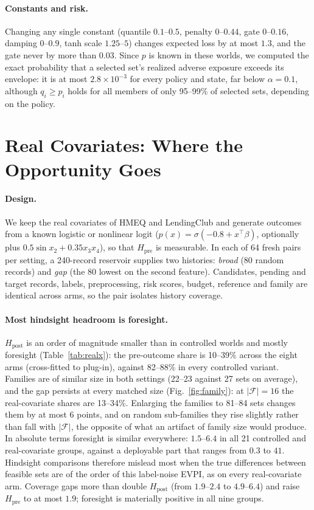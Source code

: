 \documentclass[runningheads]{llncs}
\begin{document}
\paragraph{Constants and risk.} Changing any single constant (quantile $0.1$--$0.5$, penalty $0$--$0.44$, gate $0$--$0.16$, damping $0$--$0.9$, tanh scale $1.25$--$5$) changes expected loss by at most $1.3$, and the gate never by more than $0.03$. Since $p$ is known in these worlds, we computed the exact probability that a selected set's realized adverse exposure exceeds its envelope: it is at most $2.8\times10^{-3}$ for every policy and state, far below $\alpha=0.1$, although $q_i\ge p_i$ holds for all members of only 95--99\% of selected sets, depending on the policy.

\section{Real Covariates: Where the Opportunity Goes}
\label{sec:realx}
\paragraph{Design.} We keep the real covariates of HMEQ and LendingClub and generate outcomes from a known logistic or nonlinear logit ($p(x)=\sigma(-0.8+x^\top\beta)$, optionally plus $0.5\sin x_2+0.35x_3x_4$), so that $H_{\mathrm{pre}}$ is measurable. In each of 64 fresh pairs per setting, a 240-record reservoir supplies two histories: \emph{broad} (80 random records) and \emph{gap} (the 80 lowest on the second feature). Candidates, pending and target records, labels, preprocessing, risk scores, budget, reference and family are identical across arms, so the pair isolates history coverage.

\paragraph{Most hindsight headroom is foresight.} $H_{\mathrm{post}}$ is an order of magnitude smaller than in controlled worlds and mostly foresight (Table~\ref{tab:realx}): the pre-outcome share is 10--39\% across the eight arms (cross-fitted to plug-in), against 82--88\% in every controlled variant. Families are of similar size in both settings (22--23 against 27 sets on average), and the gap persists at every matched size (Fig.~\ref{fig:family}): at $|\mathcal F|=16$ the real-covariate shares are 13--34\%. Enlarging the families to 81--84 sets changes them by at most 6 points, and on random sub-families they rise slightly rather than fall with $|\mathcal F|$, the opposite of what an artifact of family size would produce. In absolute terms foresight is similar everywhere: $1.5$--$6.4$ in all 21 controlled and real-covariate groups, against a deployable part that ranges from $0.3$ to $41$. Hindsight comparisons therefore mislead most when the true differences between feasible sets are of the order of this label-noise EVPI, as on every real-covariate arm. Coverage gaps more than double $H_{\mathrm{post}}$ (from $1.9$--$2.4$ to $4.9$--$6.4$) and raise $H_{\mathrm{pre}}$ to at most $1.9$; foresight is materially positive in all nine groups.
\end{document}
